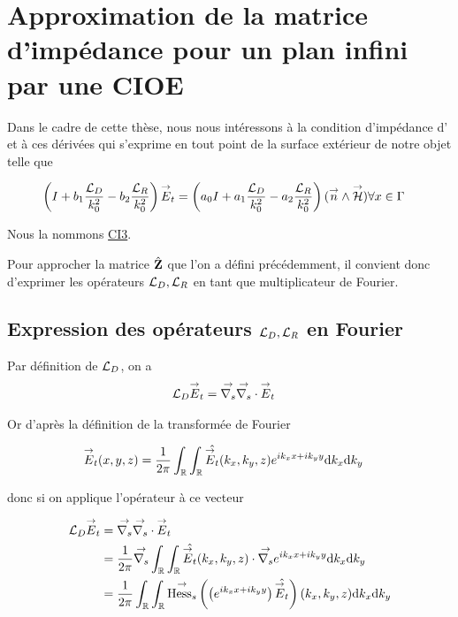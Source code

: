 \section{Approximation de la matrice d'impédance pour un plan infini par une CIOE}

    Dans le cadre de cette thèse, nous nous intéressons à la condition d'impédance d'\cite{aubakirov_electromagnetic_2014} et à ces dérivées qui s'exprime en tout point de la surface extérieur de notre objet telle que

    \begin{align}
        \left(I + b_1 \dfrac{{\mathcal{L}_D}}{k_0^2} - b_2 \dfrac{{\mathcal{L}_R}}{k_0^2} \right){\overset{\rightarrow}{E}}_t = \left(a_0 I + a_1 \dfrac{{\mathcal{L}_D}}{k_0^2} - a_2 \dfrac{{\mathcal{L}_R}}{k_0^2} \right)({\overset{\rightarrow}{n}} \wedge {\overset{\rightarrow}{\mathcal{H}}}) & \forall x \in \Gamma
    \end{align}

    Nous la nommons \hyperlink{ci3}{CI3}.

    Pour approcher la matrice \(\hat{\mathbf{Z}}\) que l'on a défini précédemment, il convient donc d'exprimer les opérateurs \({\mathcal{L}_D}, {\mathcal{L}_R}\) en tant que multiplicateur de Fourier.

  \subsection[Expression des opérateurs LD LR en Fourier]{Expression des opérateurs \({\mathcal{L}_D},{\mathcal{L}_R}\) en Fourier}

    Par définition de \({\mathcal{L}_D}\), on a
    \begin{align}
      {\mathcal{L}_D} {\overset{\rightarrow}{E}}_t & = {\overset{\rightarrow}{\nabla_s}}{} {\overset{\rightarrow}{\nabla_s}} \cdot{} {\overset{\rightarrow}{E}}_t
    \end{align}

    Or d’après la définition de la transformée de Fourier

    \begin{align}
      {\overset{\rightarrow}{E}}_t(x,y,z) & = \dfrac{1}{2\pi}\int_\mathbb R\int_\mathbb R \hat{{\overset{\rightarrow}{E}}_t}(k_x,k_y,z)e^{ik_xx + ik_yy}\mathrm{d}{k_x}\mathrm{d}{k_y}
    \end{align}

    donc si on applique l'opérateur à ce vecteur

    \begin{align}
      {\mathcal{L}_D} {\overset{\rightarrow}{E}}_t
      & = {\overset{\rightarrow}{\nabla_s}}{} {\overset{\rightarrow}{\nabla_s}} \cdot{} {\overset{\rightarrow}{E}}_t
      \\
      &=\dfrac{1}{2\pi}{\overset{\rightarrow}{\nabla_s}}{} \int_\mathbb R\int_\mathbb R \hat{{\overset{\rightarrow}{E}}_t}(k_x,k_y,z) \cdot {\overset{\rightarrow}{\nabla_s}}{} e^{ik_xx + ik_yy}\mathrm{d}{k_x}\mathrm{d}{k_y}
      \\
      &=\dfrac{1}{2\pi}\int_\mathbb R \int_\mathbb R {\overset{\rightarrow}{\operatorname{Hess}_s}}{}\left(\left( e^{ik_xx + ik_yy} \right) \hat{{\overset{\rightarrow}{E}}_t}\right)(k_x,k_y,z)\mathrm{d}{k_x}\mathrm{d}{k_y}
    \end{align}

